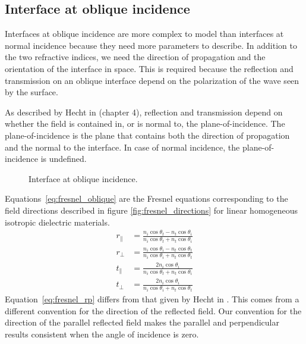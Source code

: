 
\subsection{Interface at oblique incidence}
Interfaces at oblique incidence are more complex to model than interfaces at normal incidence because they need more parameters to describe.
In addition to the two refractive indices, we need the direction of propagation and the orientation of the interface in space.
This is required because the reflection and transmission on an oblique interface depend on the polarization of the wave seen by the surface.

As described by Hecht in \cite{hecht2002optics} (chapter 4), reflection and transmission depend on whether the field is contained in, or is normal to, the plane-of-incidence.
The plane-of-incidence is the plane that contains both the direction of propagation and the normal to the interface.
In case of normal incidence, the plane-of-incidence is undefined.
\begin{figure}[hbtp]
    \centering
    \caption{\label{fig:net_interface_oblique}Interface at oblique incidence.}
\end{figure}

Equations~\eqref{eq:fresnel_oblique} are the Fresnel equations corresponding to the field directions described in figure \ref{fig:fresnel_directions} for linear homogeneous isotropic dielectric materials.
\begin{subequations}
    \begin{align}
        r_\parallel & =
        \frac{n_i \cos \theta_t - n_t \cos \theta_i}{n_i \cos \theta_t + n_t \cos \theta_i}
        \label{eq:fresnel_rp}
        \\
        r_\perp & =
        \frac{n_i \cos \theta_i - n_t \cos \theta_t}{n_i \cos \theta_i + n_t \cos \theta_t}
        \label{eq:fresnel_rs}
        \\
        t_\parallel & =
        \frac {2 n_i \cos \theta_i}{n_i \cos \theta_t + n_t \cos \theta_i}
        \label{eq:fresnel_tp}
        \\
        t_\perp & =
        \frac {2 n_i \cos \theta_i}{n_i \cos \theta_i + n_t \cos \theta_t}
        \label{eq:fresnel_ts}
    \end{align}
    \label{eq:fresnel_oblique}
\end{subequations}
Equation~\eqref{eq:fresnel_rp} differs from that given by Hecht in \cite{hecht2002optics}.
This comes from a different convention for the direction of the reflected field.
Our convention for the direction of the parallel reflected field makes the parallel and perpendicular results consistent when the angle of incidence is zero.

